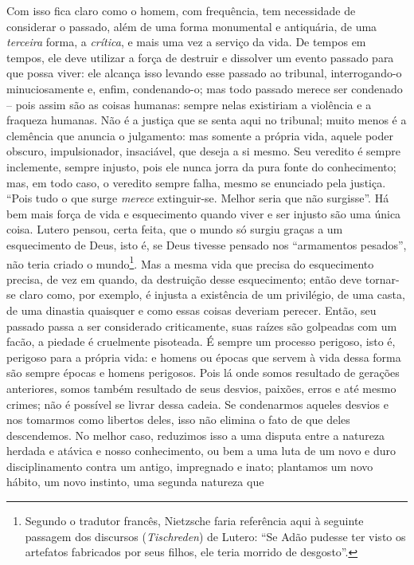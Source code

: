 Com isso fica claro como o homem, com frequência, tem necessidade de
considerar o passado, além de uma forma monumental e antiquária, de uma
\emph{terceira} forma, a \emph{crítica}, e mais uma vez a serviço da
vida. De tempos em tempos, ele deve utilizar a força de destruir e
dissolver um evento passado para que possa viver: ele alcança isso
levando esse passado ao tribunal, interrogando-o minuciosamente e, enfim,
condenando-o; mas todo passado merece ser condenado -- pois assim são as
coisas humanas: sempre nelas existiriam a violência e a fraqueza
humanas. Não é a justiça que se senta aqui no tribunal; muito menos é a
clemência que anuncia o julgamento: mas somente a própria vida, aquele
poder obscuro, impulsionador, insaciável, que deseja a si mesmo. Seu
veredito é sempre inclemente, sempre injusto, pois ele nunca jorra da
pura fonte do conhecimento; mas, em todo caso, o veredito sempre falha,
mesmo se enunciado pela justiça. ``Pois tudo o que surge
\emph{merece} extinguir-se. Melhor seria que não surgisse''. Há bem mais
força de vida e esquecimento quando viver e ser injusto são uma única
coisa. Lutero pensou, certa feita, que o mundo só surgiu graças a um
esquecimento de Deus, isto é, se Deus tivesse pensado nos ``armamentos
pesados'', não teria criado o mundo\footnote{Segundo o tradutor francês,
  Nietzsche faria referência aqui à seguinte passagem dos discursos
  (\emph{Tischreden}) de Lutero: ``Se Adão pudesse ter visto os
  artefatos fabricados por seus filhos, ele teria morrido de desgosto''.}.
Mas a mesma vida que precisa do esquecimento precisa, de vez em quando,
da destruição desse esquecimento; então deve tornar-se claro como, por
exemplo, é injusta a existência de um privilégio, de uma casta, de uma
dinastia quaisquer e como essas coisas deveriam perecer. Então, seu
passado passa a ser considerado criticamente, suas raízes são
golpeadas com um facão, a piedade é cruelmente pisoteada. É sempre
um processo perigoso, isto é, perigoso para a própria vida: e homens ou
épocas que servem à vida dessa forma são sempre épocas e homens 
perigosos. Pois lá onde somos resultado de gerações anteriores, somos
também resultado de seus desvios, paixões, erros e até mesmo crimes; não
é possível se livrar dessa cadeia. Se condenarmos aqueles desvios e nos
tomarmos como libertos deles, isso não elimina o fato de que deles
descendemos. No melhor caso, reduzimos isso a uma disputa entre a
natureza herdada e atávica e nosso conhecimento, ou bem a uma luta de um
novo e duro disciplinamento contra um antigo, impregnado e inato;
plantamos um novo hábito, um novo instinto, uma segunda natureza que
